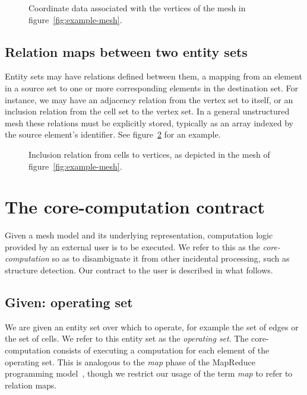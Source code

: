 \begin{figure}
    
    \caption{Coordinate data associated with the vertices of the mesh in figure~\ref{fig:example-mesh}.}
    \label{fig:associative-data}
\end{figure}


\subsection{Relation maps between two entity sets}
Entity sets may have relations defined between them, a mapping from an element in a source set to one or more corresponding elements in the destination set. For instance, we may have an adjacency relation from the vertex set to itself, or an inclusion relation from the cell set to the vertex set.
In a general unstructured mesh these relations must be explicitly stored, typically as an array indexed by the source element's identifier.
See figure~\ref{fig:relation} for an example.

\begin{figure}
    
    \caption{Inclusion relation from cells to vertices, as depicted in the mesh of figure~\ref{fig:example-mesh}.}
    \label{fig:relation}
\end{figure}




\section{The core-computation contract}
Given a mesh model and its underlying representation, computation logic provided by an external user is to be executed. We refer to this as the \emph{core-computation} so as to disambiguate it from other incidental processing, such as structure detection.
Our contract to the user is described in what follows.

\subsection{Given: operating set}
We are given an entity set over which to operate, for example the set of edges or the set of cells. We refer to this entity set as the \emph{operating set}. The core-computation consists of executing a computation for each element of the operating set. This is analogous to the \emph{map} phase of the MapReduce programming model~\cite{dean2008mapreduce}, though we restrict our usage of the term \emph{map} to refer to relation maps.

